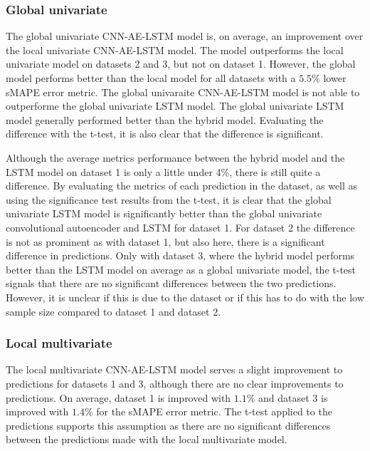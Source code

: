 \subsubsection{Global univariate}
\label{section:discussion&results:experiment-results:CNN-AE-LSTM:Global-Univariate}
The global univariate CNN-AE-LSTM model is, on average, an improvement over the local univariate CNN-AE-LSTM model.
The model outperforms the local univariate model on datasets 2 and 3, but not on dataset 1.
However, the global model performs better than the local model for all datasets with
a $5.5\%$ lower sMAPE error metric.
The global univaraite CNN-AE-LSTM model is not able to outperforme the global univariate LSTM model.
The global univariate LSTM model generally performed better than the hybrid model.
Evaluating the difference with the t-test, it is also clear that the difference is significant.

Although the average metrics performance between the hybrid model and the LSTM model on dataset 1 is only a little under 4\%,
there is still quite a difference.
By evaluating the metrics of each prediction in the dataset, as well as using the significance test results from the t-test,
it is clear that the global univariate LSTM model is significantly better than the global univariate convolutional autoencoder and LSTM for dataset 1.
For dataset 2 the difference is not as prominent as with dataset 1, but also here, there is a significant difference in predictions.
Only with dataset 3, where the hybrid model performs better than the LSTM model on average as a global univariate model,
the t-test signals that there are no significant differences between the two predictions.
However, it is unclear if this is due to the dataset or if this has to do with the low sample size compared to dataset 1 and dataset 2.




\subsubsection{Local multivariate}
\label{section:discussion&results:experiment-results:CNN-AE-LSTM:Local-Multivariate}
The local multivariate CNN-AE-LSTM model serves a slight improvement to predictions for datasets 1 and 3,
although there are no clear improvements to predictions.
On average, dataset 1 is improved with $1.1\%$ and dataset 3 is improved with $1.4\%$ for the sMAPE error metric.
The t-test applied to the predictions supports this assumption as there are no significant
differences between the predictions made with the local multivariate model.

